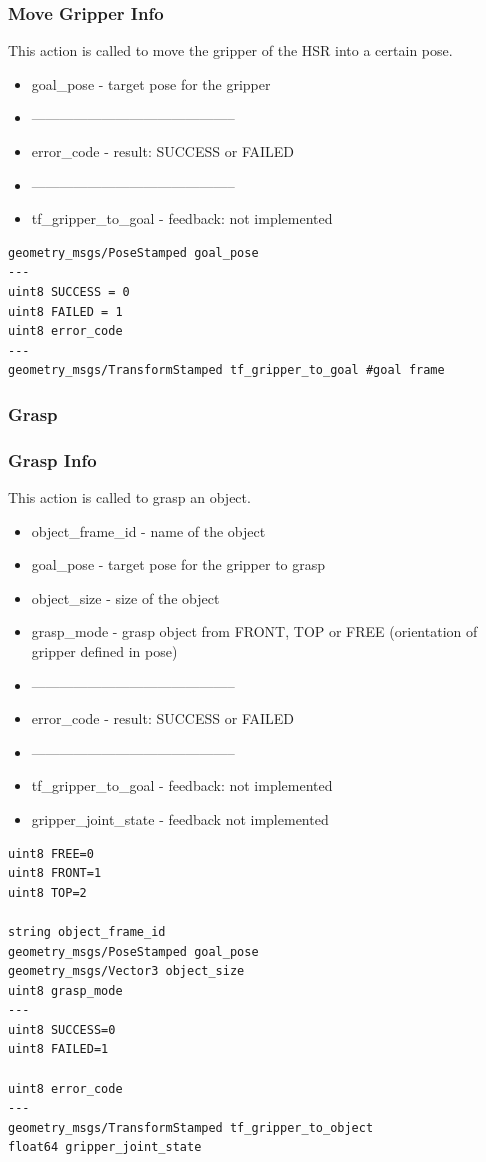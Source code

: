 \documentclass[main.tex]{subfiles}
\begin{document}
				\subsubsection{Move Gripper Info}
				This action is called to move the gripper of the HSR into a certain pose.
				\begin{itemize}
					\item goal\_pose - target pose for the gripper
					\item --------------------------------------------
					\item error\_code - result: SUCCESS or FAILED
					\item --------------------------------------------
					\item tf\_gripper\_to\_goal - feedback: not implemented
				\end{itemize}
					\begin{lstlisting}
geometry_msgs/PoseStamped goal_pose
---
uint8 SUCCESS = 0
uint8 FAILED = 1
uint8 error_code
---
geometry_msgs/TransformStamped tf_gripper_to_goal #goal frame
\end{lstlisting}
				\subsubsection{Grasp}
				\label{msg_grasp}
				\subsubsection{Grasp Info}
				This action is called to grasp an object.
				\begin{itemize}
					\item object\_frame\_id - name of the object
					\item goal\_pose - target pose for the gripper to grasp
					\item object\_size - size of the object
					\item grasp\_mode - grasp object from FRONT, TOP or FREE (orientation of gripper defined in pose)
					\item --------------------------------------------
					\item error\_code - result: SUCCESS or FAILED
					\item --------------------------------------------
					\item tf\_gripper\_to\_goal - feedback: not implemented
					\item gripper\_joint\_state - feedback not implemented
				\end{itemize}
					\begin{lstlisting}
uint8 FREE=0
uint8 FRONT=1
uint8 TOP=2
		
string object_frame_id
geometry_msgs/PoseStamped goal_pose 
geometry_msgs/Vector3 object_size
uint8 grasp_mode
---
uint8 SUCCESS=0
uint8 FAILED=1
		
uint8 error_code
---
geometry_msgs/TransformStamped tf_gripper_to_object
float64 gripper_joint_state\end{lstlisting}
\end{document}
